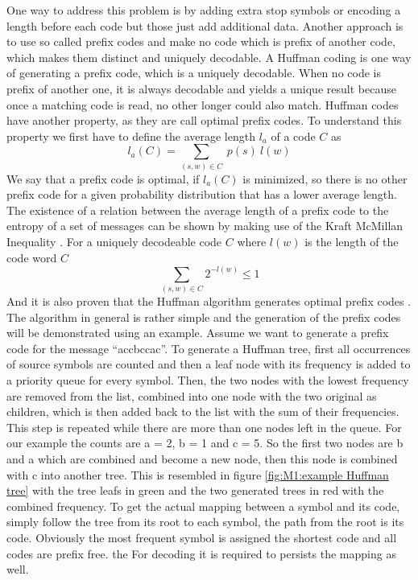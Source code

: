\par{
One way to address this problem is by adding extra stop symbols or encoding a length before each code but those just add additional data. Another approach is to use so called prefix codes and make no code which is prefix of another code, which makes them distinct and uniquely decodable. A Huffman coding is one way of generating a prefix code, which is a uniquely decodable. When no code is prefix of another one, it is always decodable and yields a unique result because once a matching code is read, no other longer could also match. Huffman codes have another property, as they are call
optimal prefix codes. To understand this property we first have to define the average length $l_a$ of a code $C$ as 
\[
l_a(C) = \sum_{(s,w)\in C} \: p(s) \: l(w)
\]
We say that a prefix code is optimal, if $l_a(C)$ is minimized, so there is no other prefix code for a given probability distribution that has a lower average length. The existence of a relation between the average length of a prefix code to the entropy of a set of messages can be shown by making use of the Kraft McMillan Inequality \cite{mcKillan}. For a uniquely decodeable code $C$ where $l(w)$ is the length of the code word $C$
\[
\sum_{(s,w)\in C} 2^{-l(w)} \leq 1
\]
And it is also proven that the Huffman algorithm generates optimal prefix codes \cite{compressionIntroduction}. The algorithm	 in general is rather simple and the generation of the prefix codes will be demonstrated using an example. Assume we want to generate a prefix code for the message \enquote{accbccac}. To generate a Huffman tree, first all occurrences of source symbols are counted and then a leaf node with its frequency is added to a priority queue for every symbol. Then, the two nodes with the lowest frequency are removed from the list, combined into one node with the two original as children, which is then added back to the list with the sum of their frequencies. This step is repeated while there are more than one nodes left in the queue. For our example the counts are a = 2, b = 1 and c = 5. So the first two nodes are b and a which are combined and become a new node, then this node is combined with c into another tree. This is resembled in figure \ref{fig:M1:example Huffman tree} with the tree leafs in green and the two generated trees in red with the combined frequency. To get the actual mapping between a symbol and its code, simply follow the tree from its root to each symbol, the path from the root is its code. Obviously the most frequent symbol is assigned the shortest code and all codes are prefix free. the For decoding it is required to persists the mapping as well.

}
